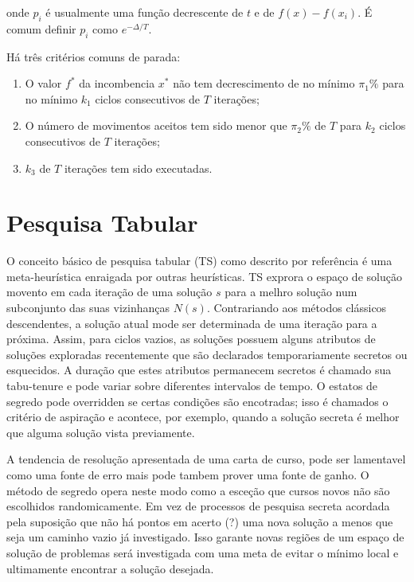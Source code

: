  onde $p_i$ é usualmente uma função decrescente de $t$ e de $f(x)-f(x_i)$. É comum definir $p_i$
como $e^{-\Delta/T}.$

 Há três critérios comuns de parada:

\begin{enumerate}
\item O valor $f^*$ da incombencia $x^*$ não tem decrescimento de no mínimo $\pi_1\%$ para no mínimo
$k_1$ ciclos consecutivos de $T$ iterações;
\item O número de movimentos aceitos tem sido menor que $\pi_2\%$ de $T$ para $k_2$ ciclos
consecutivos de $T$ iterações;
\item $k_3$ de $T$ iterações tem sido executadas.
\end{enumerate}

\section{Pesquisa Tabular}

 O conceito básico de pesquisa tabular (TS) como descrito por {\color{red} referência} é uma
meta-heurística enraigada por outras heurísticas. TS exprora o espaço de solução movento em cada
iteração de uma solução $s$ para a melhro solução num subconjunto das suas vizinhanças $N(s)$.
Contrariando aos métodos clássicos descendentes, a solução atual mode ser determinada de uma
iteração para a próxima. Assim, para ciclos vazios, as soluções possuem alguns atributos de soluções
exploradas recentemente que são declarados temporariamente secretos ou esquecidos. A duração que
estes atributos permanecem secretos é chamado sua tabu-tenure e pode variar sobre diferentes
intervalos de tempo. O estatos de segredo pode overridden se certas condições são encotradas; isso é
chamados o critério de aspiração e acontece, por exemplo, quando a solução secreta é melhor que
alguma solução vista previamente.

 A tendencia de resolução apresentada de uma carta de curso, pode ser lamentavel como uma fonte de
erro mais pode tambem prover uma fonte de ganho. O método de segredo opera neste modo como a esceção
que cursos novos não são escolhidos randomicamente. Em vez de processos de pesquisa secreta acordada
pela suposição que não há pontos em acerto (?) uma nova solução a menos que seja um caminho vazio já
investigado. Isso garante novas regiões de um espaço de solução de problemas será investigada com
uma meta de evitar o mínimo local e ultimamente encontrar a solução desejada.

